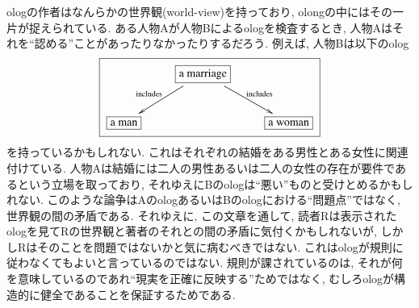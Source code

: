 \begin{warning}\label{warn:worldview}


ologの作者はなんらかの世界観(world-view)を持っており, olongの中にはその一片が捉えられている. ある人物Aが人物Bによるologを検査するとき, 人物Aはそれを``認める''ことがあったりなかったりするだろう. 例えば, 人物Bは以下のolog$$\fbox{\xymatrix{&\fbox{a marriage}\LA{dr}{ includes}\LAL{dl}{includes }\\\fbox{a man}&&\fbox{a woman}}}$$を持っているかもしれない. これはそれぞれの結婚をある男性とある女性に関連付けている. 人物Aは結婚には二人の男性あるいは二人の女性の存在が要件であるという立場を取っており, それゆえにBのologは``悪い''ものと受けとめるかもしれない. このような論争はAのologあるいはBのologにおける``問題点''ではなく, 世界観の間の矛盾である. それゆえに, この文章を通して, 読者Rは表示されたologを見てRの世界観と著者のそれとの間の矛盾に気付くかもしれないが, しかしRはそのことを問題ではないかと気に病むべきではない. これはologが規則に従わなくてもよいと言っているのではない. 規則が課されているのは, それが何を意味しているのであれ``現実を正確に反映する''ためではなく, むしろologが構造的に健全であることを保証するためである.



\end{warning}
